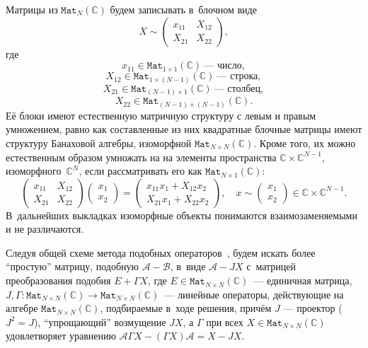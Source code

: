 \documentclass[14pt,a4paper]{extarticle}
\numberwithin{equation}{section}
\theoremstyle{definition}
\begin{document}
Матрицы из \( \mathtt{Mat}_N(\mathbb{C}) \) будем записывать в~блочном виде
\[ X \sim
    \begin{pmatrix}
    x_{11} & X_{12} \\
    X_{21} & X_{22}
    \end{pmatrix}, \]
    где \[ x_{11} \in \mathtt{Mat}_{1{\times}1}(\mathbb{C})\ \text{--- число}, \]
    \[ X_{12} \in \mathtt{Mat}_{1{\times}(N-1)}(\mathbb{C})\ \text{--- строка}, \]
    \[ X_{21} \in \mathtt{Mat}_{(N-1){\times}1}(\mathbb{C})\ \text{--- столбец}, \]
    \[ X_{22} \in \mathtt{Mat}_{(N-1){\times}(N-1)}(\mathbb{C}). \]
Её блоки имеют естественную матричную структуру с левым и правым умножением,
равно как составленные из них квадратные блочные матрицы имеют структуру
Банаховой алгебры, изоморфной \( \mathtt{Mat}_{N{\times}N}(\mathbb{C})\).
Кроме того, их можно естественным образом умножать на
на элементы пространства \( \mathbb{C}\times\mathbb{C}^{N-1} \),
изоморфного~\( \mathbb{C}^N \), если рассматривать его как
\( \mathtt{Mat}_{N{\times}1}(\mathbb{C})\):
\[
    \begin{pmatrix}
    x_{11} & X_{12} \\
    X_{21} & X_{22}
    \end{pmatrix}
    \begin{pmatrix} x_1 \\ x_2 \end{pmatrix}
  = \begin{pmatrix}
      x_{11} x_1 + X_{12} x_2 \\
      X_{21} x_1 + X_{22} x_2
      \end{pmatrix},\quad x \sim \begin{pmatrix} x_1 \\ x_2 \end{pmatrix}\in \mathbb{C}\times\mathbb{C}^{N-1}.
    \]
В~дальнейших выкладках изоморфные объекты понимаются взаимозаменяемыми и не различаются.

Следуя общей схеме метода подобных операторов~\cite{baskakov1986theorem,baskakov1987theorem,baskakov1994spectral,baskakov2002splitting},
будем искать более ``простую'' матрицу, подобную \( \mathcal{A} - \mathcal{B} \),
в~виде \( \mathcal{A} - J X \)
с~матрицей преобразования подобия \( E + \Gamma X \),
где \( E\in{\mathtt{Mat}_{N{\times}N}(\mathbb{C})} \)~--- единичная матрица,
\( J,\Gamma : \mathtt{Mat}_{N{\times}N}(\mathbb{C})\to\mathtt{Mat}_{N{\times}N}(\mathbb{C}) \)~--- линейные операторы,
действующие на алгебре \( \mathtt{Mat}_{N{\times}N}(\mathbb{C}) \), подбираемые
в~ходе решения,
      прич\"ем \( J \) --- проектор (\(J^2=J\)),
      ``упрощающий'' возмущение \( JX \),
      а \( \Gamma \)
      при всех \( X\in {\mathtt{Mat}_{N{\times}N}(\mathbb{C})} \) %
      удовлетворяет уравнению
          \( \mathcal{A}\Gamma X - (\Gamma X) \mathcal{A} = X - JX. \)
\end{document}
